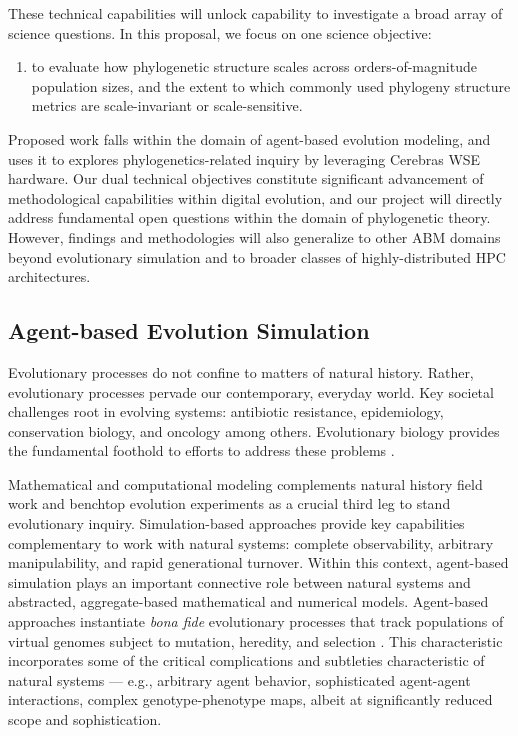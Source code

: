 These technical capabilities will unlock capability to investigate a broad array of science questions.
In this proposal, we focus on one science objective:
\begin{enumerate}
\item to evaluate how phylogenetic structure scales across orders-of-magnitude population sizes, and the extent to which commonly used phylogeny structure metrics are scale-invariant or scale-sensitive.
\end{enumerate}

Proposed work falls within the domain of agent-based evolution modeling, and uses it to explores phylogenetics-related inquiry by leveraging Cerebras WSE hardware.
Our dual technical objectives constitute significant advancement of methodological capabilities within digital evolution, and our project will directly address fundamental open questions within the domain of phylogenetic theory.
However, findings and methodologies will also generalize to other ABM domains beyond evolutionary simulation and to broader classes of highly-distributed HPC architectures.

\subsection{Agent-based Evolution Simulation}

Evolutionary processes do not confine to matters of natural history.
Rather, evolutionary processes pervade our contemporary, everyday world.
Key societal challenges root in evolving systems: antibiotic resistance, epidemiology, conservation biology, and oncology among others.  %
Evolutionary biology provides the fundamental foothold to efforts to address these problems \citep{aktipis2013evolutionary}.

Mathematical and computational modeling complements natural history field work and benchtop evolution experiments as a crucial third leg to stand evolutionary inquiry.
Simulation-based approaches provide key capabilities complementary to work with natural systems: complete observability, arbitrary manipulability, and rapid generational turnover.
Within this context, agent-based simulation plays an important connective role between natural systems and abstracted, aggregate-based mathematical and numerical models.
Agent-based approaches instantiate \textit{bona fide} evolutionary processes that track populations of virtual genomes subject to mutation, heredity, and selection \citep{pennock2007models}.
This characteristic incorporates some of the critical complications and subtleties characteristic of natural systems --- e.g., arbitrary agent behavior, sophisticated agent-agent interactions, complex genotype-phenotype maps, albeit at significantly reduced scope and sophistication.

